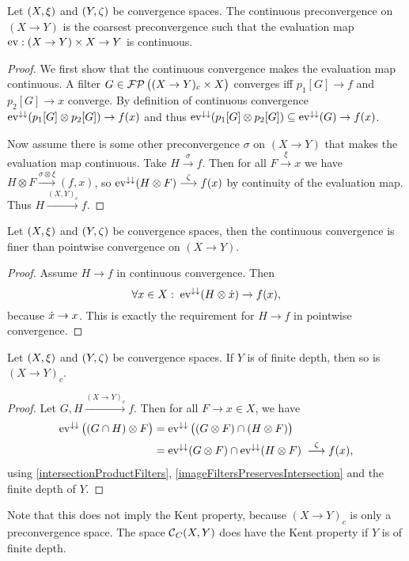 \begin{lemma}
Let $\left( X,\xi \right)$ and $\left( Y,\zeta \right)$ be convergence spaces. The continuous preconvergence on $(X\to Y)$ is the coarsest preconvergence such that the evaluation map $\operatorname{ev}: (X\to Y)\times X \to Y$ is continuous.
\end{lemma}
\begin{proof}
We first show that the continuous convergence makes the evaluation map continuous. A filter $G\in\operatorname{\mathcal{FP}}\big((X\to Y)_c\times X\big)$ converges iff $p_1[G]\to f$ and $p_2[G]\to x$ converge. By definition of continuous convergence $\operatorname{ev}^{\downarrow\downarrow}(p_1[G] \otimes p_2[G]) \to f(x)$ and thus $\operatorname{ev}^{\downarrow\downarrow}(p_1[G] \otimes p_2[G]) \subseteq \operatorname{ev}^{\downarrow\downarrow}(G) \to f(x)$.

Now assume there is some other preconvergence $\sigma$ on $(X\to Y)$ that makes the evaluation map continuous. Take $H \overset{\sigma}{\longrightarrow} f$. Then for all $F\overset{\xi}{\longrightarrow}x$ we have $H\otimes F\overset{\sigma\otimes \xi}{\longrightarrow} (f,x)$, so $\operatorname{ev}^{\downarrow\downarrow}(H\otimes F) \overset{\zeta}{\longrightarrow} f(x)$ by continuity of the evaluation map. Thus $H\overset{(X,Y)_c}{\longrightarrow} f$.
\end{proof}

\begin{lemma}
Let $\left( X,\xi \right)$ and $\left( Y,\zeta \right)$ be convergence spaces, then the continuous convergence is finer than pointwise convergence on $(X\to Y)$.
\end{lemma}
\begin{proof}
Assume $H\to f$ in continuous convergence. Then
\[ \forall x\in X: \; \operatorname{ev}^{\downarrow\downarrow}(H\otimes \dot{x}) \to f(x), \]
because $\dot{x}\to x$. This is exactly the requirement for $H\to f$ in pointwise convergence.
\end{proof}


\begin{lemma}
Let $\left( X,\xi \right)$ and $\left( Y,\zeta \right)$ be convergence spaces. If $Y$ is of finite depth, then so is $(X\to Y)_c$.
\end{lemma}
\begin{proof}
Let $G, H\overset{(X\to Y)_c}{\longrightarrow} f$. Then for all $F\to x\in X$, we have
\begin{align*}
\operatorname{ev}^{\downarrow\downarrow}\big((G\cap H)\otimes F\big) &= \operatorname{ev}^{\downarrow\downarrow}\big((G \otimes F) \cap (H \otimes F)\big) \\
&= \operatorname{ev}^{\downarrow\downarrow}(G \otimes F) \cap \operatorname{ev}^{\downarrow\downarrow}(H \otimes F) \; \overset{\zeta}{\longrightarrow} f(x),
\end{align*}
using \ref{intersectionProductFilters}, \ref{imageFiltersPreservesIntersection} and the finite depth of $Y$.
\end{proof}
Note that this does not imply the Kent property, because $(X\to Y)_c$ is only a preconvergence space. The space $\operatorname{\mathcal{C}}_C(X,Y)$ does have the Kent property if $Y$ is of finite depth.

